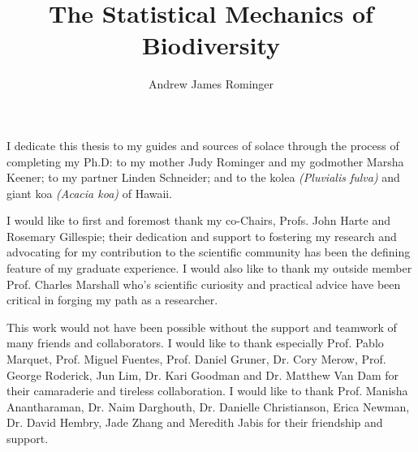 \documentclass{ucbthesis}
\begin{document}

\title{The Statistical Mechanics of Biodiversity}
\author{Andrew James Rominger}

\maketitle
\approvalpage
\copyrightpage



\begin{frontmatter}

\begin{dedication}
\null\vfil
\begin{center}
  I dedicate this thesis to my guides and sources of solace through
  the process of completing my Ph.D: to my mother Judy Rominger and my
  godmother Marsha Keener; to my partner Linden Schneider; and to the
  kolea \textit{(Pluvialis fulva)} and giant koa \textit{(Acacia koa)}
  of Hawaii.
\end{center}
\vfil\null
\end{dedication}


\tableofcontents
\clearpage
\listoffigures
\clearpage
\listoftables

\begin{acknowledgements}
I would like to first and foremost thank my co-Chairs, Profs. John Harte
and Rosemary Gillespie; their dedication and support to fostering my
research and advocating for my contribution to the scientific
community has been the defining feature of my graduate experience.  I
would also like to thank my outside member Prof. Charles Marshall who's
scientific curiosity and practical advice have been critical in
forging my path as a researcher.

This work would not have been possible without the support and
teamwork of many friends and collaborators.  I would like to thank
especially Prof. Pablo Marquet, Prof. Miguel Fuentes, Prof. Daniel Gruner,
Dr. Cory Merow, Prof. George Roderick, Jun Lim, Dr. Kari Goodman and Dr.
Matthew Van Dam for their camaraderie and tireless collaboration.  I
would like to thank Prof. Manisha Anantharaman, Dr. Naim Darghouth,
Dr. Danielle Christianson, Erica Newman, Dr. David Hembry, Jade Zhang
and Meredith Jabis for their friendship and support.


\end{acknowledgements}
\end{frontmatter}
\end{document}
